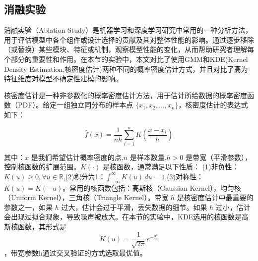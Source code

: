 \subsection{消融实验}
消融实验（Ablation Study）是机器学习和深度学习研究中常用的一种分析方法，用于评估模型中各个组件或设计选择的贡献及其对整体性能的影响。通过逐步移除（或替换）某些模块、特征或机制，观察模型性能的变化，从而帮助研究者理解每个部分的重要性和作用。在本节的实验中，本文对比了使用GMM和KDE\cite{davis2011remarks}(Kernel Density Estimation,核密度估计)两种不同的概率密度估计方式，并且对比了高为特征维度对模型不确定性建模的影响。

核密度估计是一种非参数化的概率密度估计方法，用于估计所给数据的概率密度函数（PDF）。给定一组独立同分布的样本点 $\{x_1, x_2, \ldots, x_n\}$，核密度估计的表达式如下：

\[
\hat{f}(x) = \frac{1}{n h} \sum_{i=1}^n K\left(\frac{x - x_i}{h}\right)
\]

其中：$x$ 是我们希望估计概率密度的点,$n$ 是样本数量,$h > 0$ 是带宽（平滑参数），控制核函数的扩展范围。$K(\cdot)$ 是核函数，通常满足以下性质： (1)非负性：$K(u) \geq 0, \forall u \in \mathbb{R}$,(2)积分为1：$\int_{-\infty}^\infty K(u) \, du = 1$,(3)对称性：$K(u) = K(-u)$。常用的核函数包括：高斯核（Gaussian Kernel），均匀核（Uniform Kernel），三角核（Triangle Kernel）。带宽 $h$ 是核密度估计中最重要的参数之一，如果 $h$ 过大，估计会过于平滑，丢失数据的细节。如果 $h$ 过小，估计会出现过拟合现象，导致噪声被放大。在本节的实验中，KDE选用的核函数是高斯核函数，其形式是\[K(u) = \frac{1}{\sqrt{2\pi}} e^{-\frac{u^2}{2}}\]，带宽参数h通过交叉验证的方式选取最优值。

